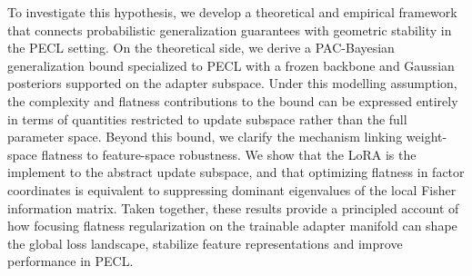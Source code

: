 \documentclass[10pt]{article} %
\begin{document}
To investigate this hypothesis, we develop a theoretical and empirical framework that connects probabilistic generalization guarantees with geometric stability in the PECL setting. On the theoretical side, we derive a PAC-Bayesian generalization bound specialized to PECL with a frozen backbone and Gaussian posteriors supported on the adapter subspace. Under this modelling assumption, the complexity and flatness contributions to the bound can be expressed entirely in terms of quantities restricted to update subspace rather than the full parameter space. Beyond this bound, we clarify the mechanism linking weight-space flatness to feature-space robustness. We show that the LoRA is the implement to the abstract update subspace, and that optimizing flatness in factor coordinates is equivalent to suppressing dominant eigenvalues of the local Fisher information matrix. Taken together, these results provide a principled account of how focusing flatness regularization on the trainable adapter manifold can shape the global loss landscape, stabilize feature representations and improve performance in PECL.







\end{document}
